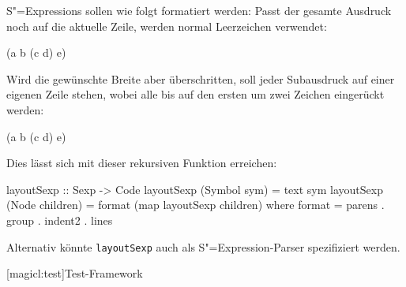 \documentclass[11pt, a4paper, bibgerm]{scrbook}
\newcommand\icode[1]{\lstinline?#1?}
\newcommand\lsection{}
\newcommand{\sexp}{S"=Expression}
\newcommand{\sexps}{S"=Expressions}
\begin{document}
\sexps{} sollen wie folgt formatiert werden: Passt der gesamte Ausdruck
noch auf die aktuelle Zeile, werden normal Leerzeichen verwendet:
\begin{code}
(a b (c d) e)
\end{code}
Wird die gewünschte Breite aber überschritten, soll jeder Subausdruck
auf einer eigenen Zeile stehen, wobei alle bis auf den ersten um zwei
Zeichen eingerückt werden:
\begin{code}
(a
  b
  (c d)
  e)
\end{code}
Dies lässt sich mit dieser rekursiven Funktion erreichen:
\begin{code}
layoutSexp :: Sexp -> Code
layoutSexp (Symbol sym)    = text sym
layoutSexp (Node children) = format (map layoutSexp children)
  where format = parens . group . indent2 . lines
\end{code} %
Alternativ könnte \icode{layoutSexp} auch als \sexp{}-Parser
spezifiziert werden.

\lsection[magicl:test]{Test-Framework}
\end{document}

